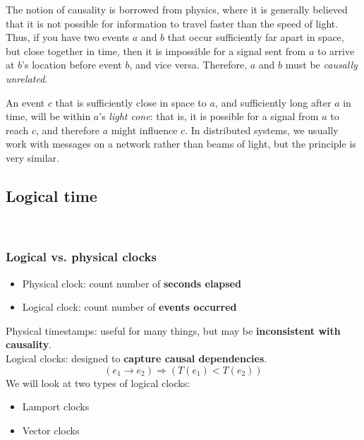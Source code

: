 The notion of causality is borrowed from physics, where it is generally believed that it is not possible for information to travel faster than the speed of light.
Thus, if you have two events $a$ and $b$ that occur sufficiently far apart in space, but close together in time, then it is impossible for a signal sent from $a$ to arrive at $b$'s location before event $b$, and vice versa.
Therefore, $a$ and $b$ must be \emph{causally unrelated}.

An event $c$ that is sufficiently close in space to $a$, and sufficiently long after $a$ in time, will be within $a$'s \emph{light cone}: that is, it is possible for a signal from $a$ to reach $c$, and therefore $a$ might influence $c$.
In distributed systems, we usually work with messages on a network rather than beams of light, but the principle is very similar.



\subsection{Logical time}\label{sec:logical-time}

\begin{frame}
    \begin{center}
        {\Large{\color{darkblue}{Broadcast protocols and logical time}}} \\[2em]
        \mydetails
    \end{center}
\end{frame}


\begin{frame}
    \label{s:logical-clocks}
    \frametitle{Logical vs. physical clocks}
    \begin{itemize}
        \item Physical clock: count number of \textbf{seconds elapsed}
        \item Logical clock: count number of \textbf{events occurred}\\[1em]
    \end{itemize}
    Physical timestamps: useful for many things, but may be \textbf{inconsistent with causality}.\\[1em]\pause
    Logical clocks: designed to \textbf{capture causal dependencies}.
    \[ (e_1 \rightarrow e_2) \Longrightarrow (T(e_1) < T(e_2)) \]\pause
    We will look at two types of logical clocks:
    \begin{itemize}
        \item Lamport clocks
        \item Vector clocks
    \end{itemize}
\end{frame}
\label{l:logical-clocks}

